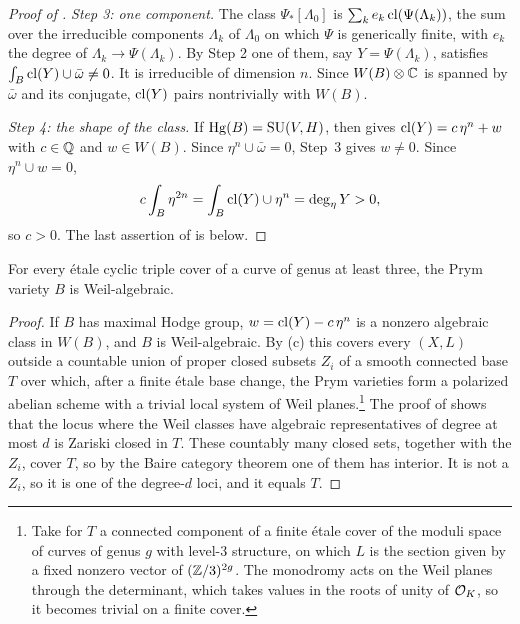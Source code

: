 \begin{proof}[Proof of ]
\emph{Step 3: one component.} The class $\Psi_{*}[\Lambda_{0}]$ is
$\sum_{k}e_{k}\operatorname{cl}(\Psi(\Lambda_{k}))$, the sum over the irreducible
components $\Lambda_{k}$ of $\Lambda_{0}$ on which $\Psi$ is generically
finite, with $e_{k}$ the degree of $\Lambda_{k}\to\Psi(\Lambda_{k})$. By Step
2 one of them, say $Y=\Psi(\Lambda_{k})$, satisfies $\int_{B}\operatorname{cl}(Y)\cup
\bar\omega\ne0$. It is irreducible of dimension $n$. Since $W(B)\otimes\mathbb{C}$
is spanned by $\bar\omega$ and its conjugate, $\operatorname{cl}(Y)$ pairs nontrivially
with $W(B)$.

\emph{Step 4: the shape of the class.} If $\operatorname{Hg}(B)=\operatorname{SU}(V,H)$, then
 gives $\operatorname{cl}(Y)=c\,\eta^{n}+w$ with $c\in\mathbb{Q}$ and $w\in
W(B)$. Since $\eta^{n}\cup\bar\omega=0$, Step~3 gives $w\ne0$. Since
$\eta^{n}\cup w=0$,
\[
  c\int_{B}\eta^{2n}=\int_{B}\operatorname{cl}(Y)\cup\eta^{n}=\deg_{\eta}Y>0,
\]
so $c>0$. The last assertion of  is 
below.
\end{proof}

\begin{corollary}\label{cor:schoen}
For every \'etale cyclic triple cover of a curve of genus at least three,
the Prym variety $B$ is Weil-algebraic.
\end{corollary}

\begin{proof}
If $B$ has maximal Hodge group, $w=\operatorname{cl}(Y)-c\,\eta^{n}$ is a nonzero
algebraic class in $W(B)$, and $B$ is Weil-algebraic. By
(c) this covers every $(X,L)$ outside a countable union of
proper closed subsets $Z_{i}$ of a smooth connected base $T$ over which, after a finite \'etale
base change, the Prym varieties form a polarized abelian scheme with a
trivial local system of Weil planes.\footnote{Take for $T$ a connected
component of a finite \'etale cover of the moduli space of curves of genus
$g$ with level-$3$ structure, on which $L$ is the section given by a fixed
nonzero vector of $(\mathbb{Z}/3)^{2g}$. The monodromy acts on the Weil planes
through the determinant, which takes values in the roots of unity of
$\mathcal{O}_{K}$, so it becomes trivial on a finite cover.} The proof of
 shows that the locus where the Weil classes have
algebraic representatives of degree at most $d$ is Zariski closed in $T$.
These countably many closed sets, together with the $Z_{i}$, cover $T$, so
by the Baire category theorem one of them has interior. It is not a $Z_{i}$,
so it is one of the degree-$d$ loci, and it equals $T$.
\end{proof}

